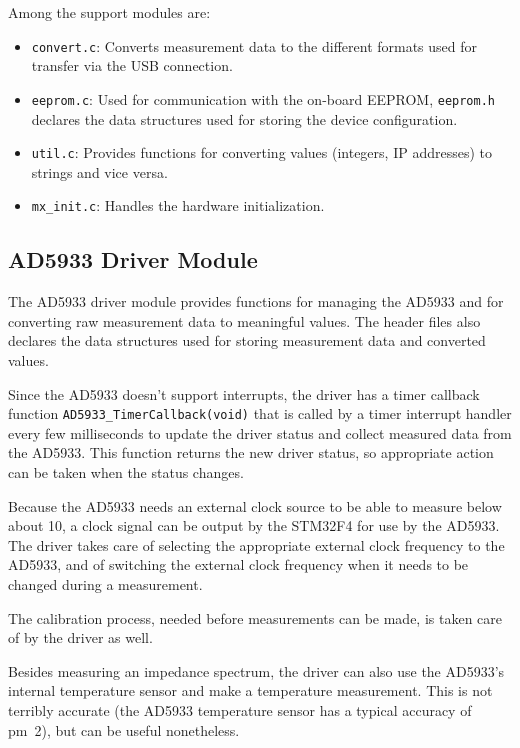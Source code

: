 Among the support modules are:
%
\begin{itemize}
	\item \verb!convert.c!: Converts measurement data to the different formats used for transfer via the USB connection.
  
  \item \verb!eeprom.c!: Used for communication with the on-board EEPROM, \verb!eeprom.h! declares the data
        structures used for storing the device configuration.
  
  \item \verb!util.c!: Provides functions for converting values (integers, IP addresses) to strings and vice versa.
  
  \item \verb!mx_init.c!: Handles the hardware initialization.
\end{itemize}


\subsection{AD5933 Driver Module}

The AD5933 driver module provides functions for managing the AD5933 and for converting raw measurement data to
meaningful values. The header files also declares the data structures used for storing measurement data and converted
values.

Since the AD5933 doesn't support interrupts, the driver has a timer callback function \verb!AD5933_TimerCallback(void)!
that is called by a timer interrupt handler every few milliseconds to update the driver status and collect measured
data from the AD5933. This function returns the new driver status, so appropriate action can be taken when the status
changes.

Because the AD5933 needs an external clock source to be able to measure below about \unit{10}{\kilo\hertz},
a clock signal can be output by the STM32F4 for use by the AD5933. The driver takes care of selecting the appropriate
external clock frequency to the AD5933, and of switching the external clock frequency when it needs to be changed
during a measurement.

The calibration process, needed before measurements can be made, is taken care of by the driver as well.

Besides measuring an impedance spectrum, the driver can also use the AD5933's internal temperature sensor and make a
temperature measurement. This is not terribly accurate (the AD5933 temperature sensor has a typical accuracy of
\unit{\pm 2}{\celsius}), but can be useful nonetheless.


